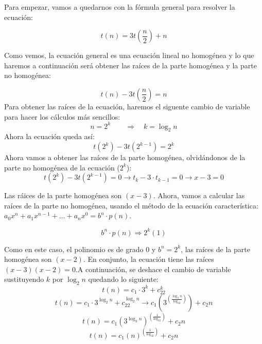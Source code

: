 \documentclass[10pt,a4paper,spanish]{report}
\begin{document}
\begin{center}
  Para empezar, vamos a quedarnos con la fórmula general para resolver la ecuación:

  \begin{displaymath}
    t(n) = 3t\left(\frac{n}{2}\right) + n
  \end{displaymath}

  Como vemos, la ecuación general es una ecuación lineal no homogénea y lo que haremos a continuación será obtener las raíces de la parte homogénea y la parte no homogénea:

  \begin{displaymath}
    t(n) - 3t\left(\frac{n}{2}\right) = n
  \end{displaymath}
  Para obtener las raíces de la ecuación, haremos el siguente cambio de variable para hacer los cálculos más sencillos:
  \begin{displaymath}
    n = 2^k \qquad \Longrightarrow \quad k = \log_2 n
  \end{displaymath}
  Ahora la ecuación queda así:
  \begin{displaymath}
    t(2^k) - 3t(2^{k-1}) = 2^k
  \end{displaymath}
  Ahora vamos a obtener las raíces de la parte homogénea, olvidándonos de la parte no homogénea de la ecuación ($2^k$):
  \begin{displaymath}
    t(2^k) -3t(2^{k-1}) = 0 \longrightarrow t_k - 3\cdot t_{k-1} = 0 \longrightarrow x - 3 = 0
  \end{displaymath}

  Las ráices de la parte homogénea son $(x-3)$. Ahora, vamos a calcular las raíces de la parte no homogénea, usando el método de la ecuación característica: $a_0x^n + a_1x^{n-1}+\ldots+a_nx^0 = b^n\cdot p(n)$.

  \begin{displaymath}
      b^n\cdot p(n) \Rightarrow 2^k(1)
  \end{displaymath}

  Como en este caso, el polinomio es de grado 0 y $b^n = 2^k$, las raíces de la parte homogénea son $(x-2)$. En conjunto, la ecuación tiene las raíces $(x-3)(x-2) = 0$.A continuación, se deshace el cambio de variable sustituyendo $k$ por $\log_2 n$ quedando lo siguiente:
  \begin{displaymath}
    t(n) = c_1\cdot 3^k + c_22^k
  \end{displaymath}
  \begin{displaymath}
    t(n) = c_1\cdot 3^{\log_2n} + c_22^{\log_2n} \longrightarrow c_1\left(3^{\left(\frac{\log_3n}{\log_32}\right)}\right) + c_2n
  \end{displaymath}
  \begin{displaymath}
    t(n) = c_1\left(3^{\log_3n}\right)^{\left(\frac{1}{\log_32}\right)} + c_2n
  \end{displaymath}
  \begin{displaymath}
    t(n) = c_1\left(n\right)^{\left(\frac{1}{\log_32}\right)} + c_2n
  \end{displaymath}
\end{center}
\end{document}
